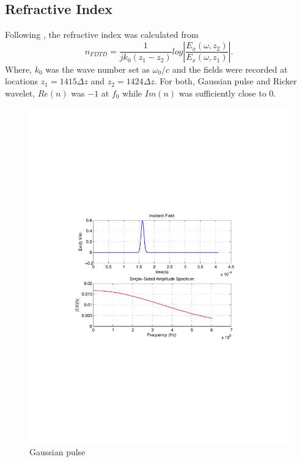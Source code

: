 \subsection{Refractive Index}
Following \cite{DNG-Ehud-Ziol}, the refractive index was calculated from
\begin{equation}
n_{FDTD} = \dfrac{1}{jk_0(z_1-z_2)}log\left|\dfrac{E_x(\omega,z_2)}{E_x(\omega,z_1)}\right|.
\label{Refractive-Index-FDTD}
\end{equation}
Where, $k_0$ was the wave number set as $\omega_0/c$ and the fields were recorded at locations $z_1=1415\Delta z$ and $z_2=1424\Delta z$. For both, Gaussian pulse and Ricker wavelet, $Re(n)$ was $-1$ at $f_0$ while $Im(n)$ was sufficiently close to $0$.
\begin{figure}[H]
\centering
\includegraphics[scale=0.8, trim=3.5cm 8.7cm 4.5cm 8.85cm, clip]{Figures/FigCh03_IncidentFieldGaussian.pdf}
\caption{Gaussian pulse}
\label{1DDNG-IncidentField-Gaussian}
\end{figure}
